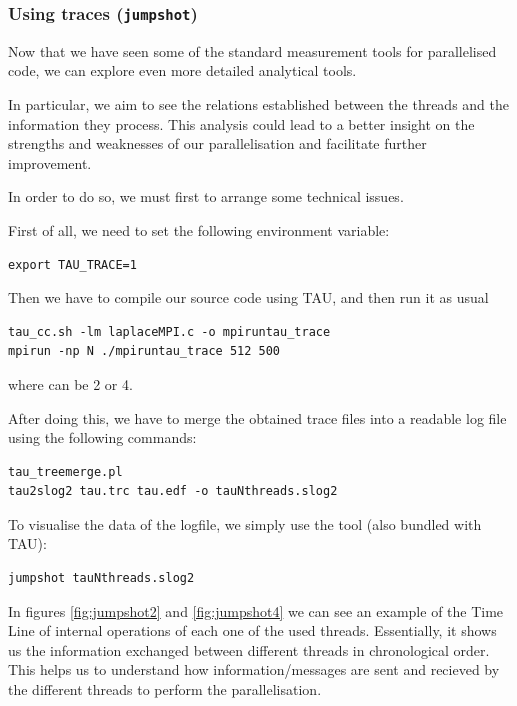 \subsubsection{Using traces (\texttt{jumpshot})}

Now that we have seen some of the standard measurement tools for parallelised code, we can explore even more detailed analytical tools. 

In particular, we aim to see the relations established between the threads and the information they process. This analysis could lead to a better insight on the strengths and weaknesses of our parallelisation and facilitate further improvement. 

In order to do so, we must first to arrange some technical issues.

First of all, we need to set the following environment variable:
\begin{lstlisting}
export TAU_TRACE=1
\end{lstlisting}

Then we have to compile our source code using TAU, and then run it as usual
\begin{lstlisting}
tau_cc.sh -lm laplaceMPI.c -o mpiruntau_trace
mpirun -np N ./mpiruntau_trace 512 500
\end{lstlisting}
where  can be 2 or 4.

After doing this, we have to merge the obtained  trace files into a readable  log file using the following commands:
\begin{lstlisting}
tau_treemerge.pl
tau2slog2 tau.trc tau.edf -o tauNthreads.slog2
\end{lstlisting}

To visualise the data of the logfile, we simply use the  tool (also bundled with TAU):
\begin{lstlisting}
jumpshot tauNthreads.slog2
\end{lstlisting}

\bigskip

In figures \ref{fig:jumpshot2} and \ref{fig:jumpshot4} we can see an example of the Time Line of internal operations of each one of the used threads. Essentially, it shows us the information exchanged between different threads in chronological order. This helps us to understand how information/messages are sent and recieved by the different threads to perform the parallelisation. 

